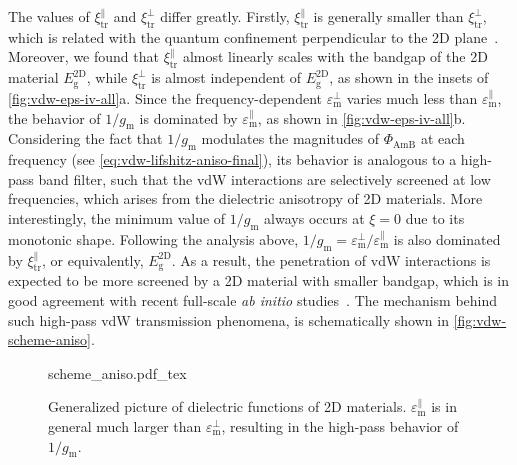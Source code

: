 The values of $\xi_{\mathrm{tr}}^{\parallel}$ and
$\xi_{\mathrm{tr}}^{\perp}$ differ greatly.
%
Firstly, \(\xi_{\mathrm{tr}}^{\parallel}\) is generally smaller than
\(\xi_{\mathrm{tr}}^{\perp}\), which is related with the quantum
confinement perpendicular to the 2D
plane~\cite{Matthes_2016_effective_PRB}.
%
Moreover, we found that $\xi_{\mathrm{tr}}^{\parallel}$ almost
linearly scales with the bandgap of the 2D material
$E_{\mathrm{g}}^{\mathrm{2D}}$, while $\xi_{\mathrm{tr}}^{\perp}$ is
almost independent of $E_{\mathrm{g}}^{\mathrm{2D}}$, as shown in the insets of \autoref{fig:vdw-eps-iv-all}a.
%
Since the frequency-dependent $\varepsilon_{\mathrm{m}}^{\perp}$ varies
much less than $\varepsilon_{\mathrm{m}}^{\parallel}$, the behavior of
\(1/g_{\mathrm{m}}\) is dominated by
$\varepsilon_{\mathrm{m}}^{\parallel}$, as shown in
\autoref{fig:vdw-eps-iv-all}b.
%
Considering the fact that $1/g_{\mathrm{m}}$ modulates the
magnitudes of $\Phi_{\mathrm{AmB}}$ at each frequency (see
\autoref{eq:vdw-lifshitz-aniso-final}), its behavior is analogous to a
high-pass band filter, such that the vdW interactions are selectively screened at low
frequencies, which arises from the dielectric anisotropy of 2D
materials.
%
More interestingly, the minimum value of $1/g_{\mathrm{m}}$ always
occurs at $\xi = 0$ due to its monotonic shape.
%
Following the analysis above, 
$1/g_{\mathrm{m}}=\varepsilon_{\mathrm{m}}^{\perp} /
\varepsilon_{\mathrm{m}}^{\parallel}$ is also dominated by $\xi_{\mathrm{tr}}^{\parallel}$, or equivalently,
$E_{\mathrm{g}}^{\mathrm{2D}}$.
%
As a result, the penetration of vdW interactions is expected to be
more screened by a 2D material with smaller bandgap, which is in good
agreement with recent full-scale {\itshape ab initio}
studies~\cite{Liu_2018_gr}.
%
The mechanism behind such high-pass vdW transmission phenomena, is
schematically shown in \autoref{fig:vdw-scheme-aniso}.
\begin{figure}[!htbp]
  \centering{}
  {scheme_aniso.pdf_tex}
  \caption{\label{fig:vdw-scheme-aniso} %
    Generalized picture of dielectric functions of 2D
    materials. $\varepsilon_{\mathrm{m}}^{\parallel}$ is in general
    much larger than $\varepsilon_{\mathrm{m}}^{\perp}$, resulting in
    the high-pass behavior of $1/g_{\mathrm{m}}$.  }
\end{figure}




